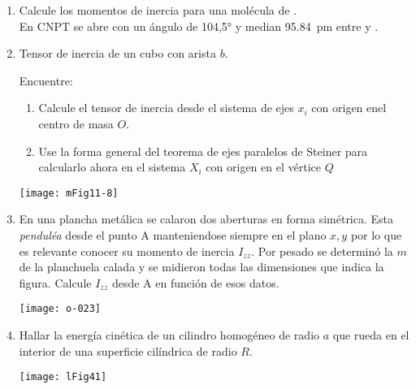 \documentclass[11pt, spanish, a4paper, twoside]{article}
\begin{document}
\begin{enumerate}
\item Calcule los momentos de inercia para una molécula de .\\
En CNPT se abre con un ángulo de \ang{104,5;;} y median \SI{95.84}{\pico\metre} entre  y .



\item 
\begin{minipage}[t][3.7cm]{0.6\textwidth}
Tensor de inercia de un cubo con arista \(b\).
	
Encuentre: 
\begin{enumerate}
	\item Calcule el tensor de inercia desde el sistema de ejes \(x_i\) con origen enel centro de masa \(O\).
	\item Use la forma general del teorema de ejes paralelos de Steiner para calcularlo ahora en el sistema \(X_i\) con origen en el vértice \(Q\) 
	\end{enumerate}
\end{minipage}
\begin{minipage}[c][1.2cm][t]{0.35\textwidth}
	\texttt{[image: mFig11-8]}
\end{minipage}



\item 
\begin{minipage}[t][4cm]{0.5\textwidth}
En una plancha metálica se calaron dos aberturas en forma simétrica.
Esta \emph{penduléa} desde el punto A manteniendose siempre en el plano \(x,y\) por lo que es relevante conocer su momento de inercia \(I_{zz}\).
Por pesado se determinó la $m$ de la planchuela calada y se midieron todas las dimensiones que indica la figura.
Calcule \(I_{zz}\) desde A en función de esos datos.
\end{minipage}
\begin{minipage}[c][1.5cm][t]{0.45\textwidth}
	\texttt{[image: o-023]}
\end{minipage}



\item 
\begin{minipage}[t][1.5cm]{0.65\textwidth}
	Hallar la energía cinética de un cilindro homogéneo de radio \(a\) que rueda en el interior de una superficie cilíndrica de radio \(R\).
\end{minipage}
\begin{minipage}[c][1.5cm][t]{0.3\textwidth}
\texttt{[image: lFig41]}
\end{minipage}




\end{enumerate}
\end{document}

